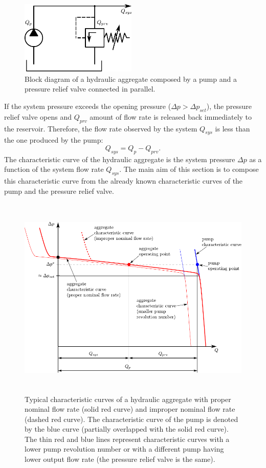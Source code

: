 \begin{figure}[ht!]
	\centering
		\includegraphics[height=3.5cm]{PositiveDisplacementPumps/Figures/Block_Diagram_Hydraulic_Aggregate.pdf}
	\caption{Block diagram of a hydraulic aggregate composed by a pump and a pressure relief valve connected in parallel.}
	\label{fig:hydraulic_aggregate}
\end{figure}

If the system pressure exceeds the opening pressure ($\Delta p > \Delta p_{set}$), the pressure relief valve opens and $Q_{prv}$ amount of flow rate is released back immediately to the reservoir. Therefore, the flow rate observed by the system $Q_{sys}$ is less than the one produced by the pump:
%
\begin{equation} \label{system_flow_rate_hydraulic_aggregate}
Q_{sys} = Q_p - Q_{prv}.
\end{equation}
%
The characteristic curve of the hydraulic aggregate is the system pressure $\Delta p$ as a function of the system flow rate $Q_{sys}$. The main aim of this section is to compose this characteristic curve from the already known characteristic curves of the pump and the pressure relief valve.

\begin{figure}[ht!]
	\centering
		\includegraphics[height=9.75cm]{PositiveDisplacementPumps/Figures/Characteristic_Curve_Hydraulic_Aggregate.pdf}
	\caption{Typical characteristic curves of a hydraulic aggregate with proper nominal flow rate (solid red curve) and improper nominal flow rate (dashed red curve). The characteristic curve of the pump is denoted by the blue curve (partially overlapped with the solid red curve). The thin red and blue lines represent characteristic curves with a lower pump revolution number or with a different pump having lower output flow rate (the pressure relief valve is the same).}
	\label{fig:characteristic_curve_hydraulic_aggregate}
\end{figure}


